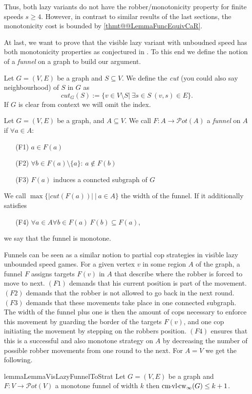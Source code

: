 Thus, both lazy variants do not have the robber\-/monotonicity property for finite speeds $s\geq4$. However, in contrast to similar results of the last sections, the monotonicity cost is bounded by \cref{thmt@@LemmaFuncEquivCaR}.

At last, we want to prove that the visible lazy variant with unboudned speed has both monotonicity properties as conjectured in \cite{doi:10.1137/090780006}. To this end we define the notion of a \emph{funnel} on a graph to build our argument.
\begin{definition}
    Let $G=(V,E)$ be a graph and $S\subseteq V$. We define the \emph{cut} (you could also say neighbourhood) of $S$ in $G$ as  
    $$cut_G(S) := \{v\in V\setminus S | \ \exists s \in S \ (v,s)\in E\}.$$
    If $G$ is clear from  context we will omit the index.    
\end{definition}
\begin{definition}
    Let $G=(V,E)$ be a graph, and $A\subseteq V$. We call $F: A \rightarrow \mathcal{P}ot(A)$ a \emph{funnel} on $A$ if $\forall a \in A$:
    \begin{itemize}
        \item[(F1)] $a \in F(a)$
        \item[(F2)] $\forall b \in F(a) \setminus \{a\}: \ a \notin F(b)$
        \item[(F3)] $F(a)$ induces a conncted subgraph of $G$
    \end{itemize}

    We call $\operatorname*{max}\{|cut(F(a))| \ | \ a \in A\}$ the width of the funnel. 
    If it additionally satisfies 
    \begin{itemize}
        \item[(F4)] $\forall a \in A \forall b \in F(a) \ F(b)\subseteq F(a)$,
    \end{itemize}
    we say that the funnel is monotone.
\end{definition}
    Funnels can be seen as a similar notion to partial cop strategies in visible lazy unbounded speed games. For a given vertex $v$ in some region $A$ of the graph, a funnel $F$ assigns targets $F(v)$ in $A$ that describe where the robber is forced to move to next. $(\mathit{F1})$ demands that his current position is part of the movement. $(\mathit{F2})$ demands that the robber is not allowed to go back in the next round. $(\mathit{F3})$ demands that these movements take place in one connected subgraph. The width of the funnel plus one is then the amount of cops necessary to enforce this movement by guarding the border of the targets $F(v)$, and one cop initiating the movement by stepping on the robbers position. $(\mathit{F4})$ ensures that this is a successful and also monotone strategy on $A$ by decreasing the number of possible robber movements from one round to the next. For $A=V$ we get the following.
\begin{restatable}{lemma}{LemmaVisLazyFunnelToStrat}
        Let $G=(V,E)$ be a graph and $F: V \rightarrow \mathcal{P}ot(V)$ a monotone funnel of width $k$ then $\cmvlcopwidth{\infty}(G)\leq k+1$.
\end{restatable}

